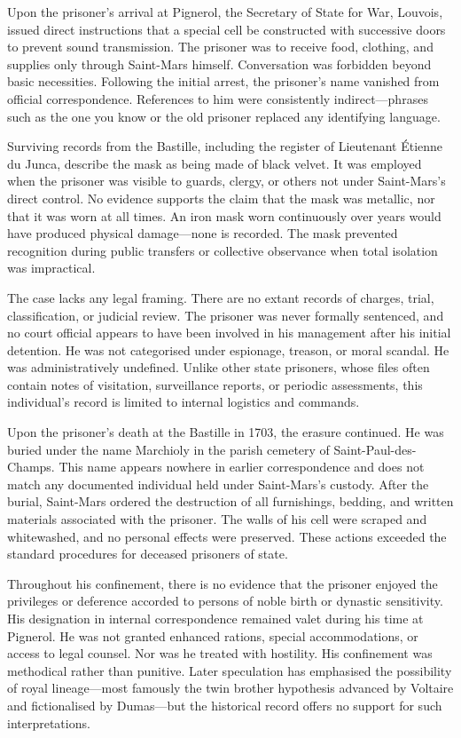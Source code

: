 Upon the prisoner's arrival at Pignerol, the Secretary of State for War, Louvois, issued direct instructions that a special cell be constructed with successive doors to prevent sound transmission. The prisoner was to receive food, clothing, and supplies only through Saint-Mars himself. Conversation was forbidden beyond basic necessities. Following the initial arrest, the prisoner's name vanished from official correspondence. References to him were consistently indirect—phrases such as \QSOpen{}the one you know\QSClose{} or \QSOpen{}the old prisoner\QSClose{} replaced any identifying language.

Surviving records from the Bastille, including the register of Lieutenant Étienne du Junca, describe the mask as being made of black velvet. It was employed when the prisoner was visible to guards, clergy, or others not under Saint-Mars’s direct control. No evidence supports the claim that the mask was metallic, nor that it was worn at all times. An iron mask worn continuously over years would have produced physical damage—none is recorded. The mask prevented recognition during public transfers or collective observance when total isolation was impractical.

The case lacks any legal framing. There are no extant records of charges, trial, classification, or judicial review. The prisoner was never formally sentenced, and no court official appears to have been involved in his management after his initial detention. He was not categorised under espionage, treason, or moral scandal. He was administratively undefined. Unlike other state prisoners, whose files often contain notes of visitation, surveillance reports, or periodic assessments, this individual's record is limited to internal logistics and commands.

Upon the prisoner's death at the Bastille in 1703, the erasure continued. He was buried under the name \QENOpen{}Marchioly\QENClose{} in the parish cemetery of Saint-Paul-des-Champs. This name appears nowhere in earlier correspondence and does not match any documented individual held under Saint-Mars's custody. After the burial, Saint-Mars ordered the destruction of all furnishings, bedding, and written materials associated with the prisoner. The walls of his cell were scraped and whitewashed, and no personal effects were preserved. These actions exceeded the standard procedures for deceased prisoners of state. 

Throughout his confinement, there is no evidence that the prisoner enjoyed the privileges or deference accorded to persons of noble birth or dynastic sensitivity. His designation in internal correspondence remained \QSOpen{}valet\QSClose{} during his time at Pignerol. He was not granted enhanced rations, special accommodations, or access to legal counsel. Nor was he treated with hostility. His confinement was methodical rather than punitive. Later speculation has emphasised the possibility of royal lineage—most famously the twin brother hypothesis advanced by Voltaire and fictionalised by Dumas—but the historical record offers no support for such interpretations.

